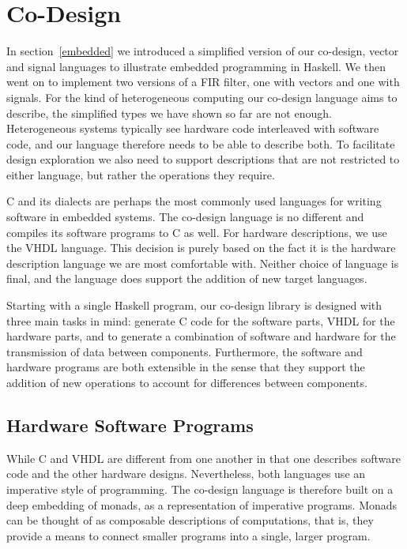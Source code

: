 \documentclass[../paper.tex]{subfiles}
\begin{document}
\chapter{Co-Design}
\label{codesign}

In section~\ref{embedded} we introduced a simplified version of our co-design, vector and signal languages to illustrate embedded programming in Haskell. We then went on to implement two versions of a FIR filter, one with vectors and one with signals. For the kind of heterogeneous computing our co-design language aims to describe, the simplified types we have shown so far are not enough. Heterogeneous systems typically see hardware code interleaved with software code, and our language therefore needs to be able to describe both. To facilitate design exploration we also need to support descriptions that are not restricted to either language, but rather the operations they require.

C and its dialects are perhaps the most commonly used languages for writing software in embedded systems. The co-design language is no different and compiles its software programs to C as well. For hardware descriptions, we use the VHDL language. This decision is purely based on the fact it is the hardware description language we are most comfortable with. Neither choice of language is final, and the language does support the addition of new target languages.

Starting with a single Haskell program, our co-design library is designed with three main tasks in mind: generate C code for the software parts, VHDL for the hardware parts, and to generate a combination of software and hardware for the transmission of data between components. Furthermore, the software and hardware programs are both extensible in the sense that they support the addition of new operations to account for differences between components.

\section{Hardware Software Programs}
\label{program}

While C and VHDL are different from one another in that one describes software code and the other hardware designs. Nevertheless, both languages use an imperative style of programming. The co-design language is therefore built on a deep embedding of monads, as a representation of imperative programs. Monads can be thought of as composable descriptions of computations, that is, they provide a means to connect smaller programs into a single, larger program.
\end{document}
